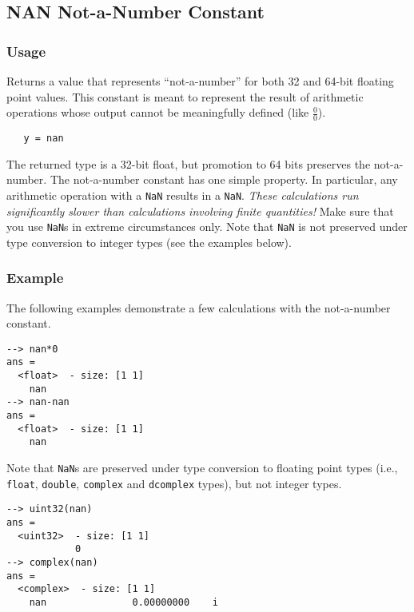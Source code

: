 %
%
%
\subsection{NAN Not-a-Number Constant}
\subsubsection{Usage}
Returns a value that represents ``not-a-number'' for both 32 and 64-bit 
floating point values.  This constant is meant to represent the result of
arithmetic operations whose output cannot be meaningfully defined (like 
$\frac{0}{0}$).
\begin{verbatim}
   y = nan
\end{verbatim}
The returned type is a 32-bit float, but promotion to 64 bits preserves the not-a-number.  The not-a-number constant has one simple property.  In particular, any arithmetic operation with a \verb|NaN| results in a \verb|NaN|. \emph{These calculations run significantly slower than calculations involving finite quantities!}  Make sure that you use \verb|NaN|s in extreme circumstances only.  Note that \verb|NaN| is not preserved under type conversion to integer types (see the examples below).
\subsubsection{Example}
The following examples demonstrate a few calculations with the not-a-number constant.
\begin{verbatim}
--> nan*0
ans =
  <float>  - size: [1 1]
    nan
--> nan-nan
ans =
  <float>  - size: [1 1]
    nan
\end{verbatim}
Note that \verb|NaN|s are preserved under type conversion to floating point types (i.e., \verb|float|, \verb|double|, \verb|complex| and \verb|dcomplex| types), but not integer  types.
\begin{verbatim}
--> uint32(nan)
ans =
  <uint32>  - size: [1 1]
            0
--> complex(nan)
ans =
  <complex>  - size: [1 1]
    nan               0.00000000    i
\end{verbatim}


